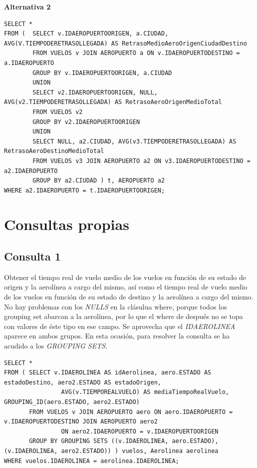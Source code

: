 \documentclass{article}
\begin{document}
\textbf{Alternativa 2}
\begin{lstlisting}
SELECT *
FROM (	SELECT v.IDAEROPUERTOORIGEN, a.CIUDAD, AVG(V.TIEMPODERETRASOLLEGADA) AS RetrasoMedioAeroOrigenCiudadDestino
		FROM VUELOS v JOIN AEROPUERTO a ON v.IDAEROPUERTODESTINO = a.IDAEROPUERTO 
		GROUP BY v.IDAEROPUERTOORIGEN, a.CIUDAD
		UNION
		SELECT v2.IDAEROPUERTOORIGEN, NULL, AVG(v2.TIEMPODERETRASOLLEGADA) AS RetrasoAeroOrigenMedioTotal
		FROM VUELOS v2 
		GROUP BY v2.IDAEROPUERTOORIGEN 
		UNION
		SELECT NULL, a2.CIUDAD, AVG(v3.TIEMPODERETRASOLLEGADA) AS RetrasoAeroDestinoMedioTotal
		FROM VUELOS v3 JOIN AEROPUERTO a2 ON v3.IDAEROPUERTODESTINO = a2.IDAEROPUERTO 
		GROUP BY a2.CIUDAD ) t, AEROPUERTO a2
WHERE a2.IDAEROPUERTO = t.IDAEROPUERTOORIGEN;
\end{lstlisting}


\newpage
\section{Consultas propias}

\subsection{Consulta 1}
Obtener el tiempo real de vuelo medio de los vuelos en función de su estado de origen y la aerolínea a cargo del mismo, así como  el tiempo real de vuelo medio de los vuelos  en función de su estado de destino y la aerolínea a cargo del mismo.\\

No hay problemas con los \textit{NULLS} en la clásulua where, porque todos los grouping set abarcan a la aerolínea, por lo que el where de después no se topa con valores de éste tipo en ese campo. Se aprovecha que el \textit{IDAEROLINEA} aparece en ambos grupos. En esta ocasión, para resolver la consulta se ha acudido a los \textit{GROUPING SETS}.

\begin{lstlisting}
SELECT *
FROM ( SELECT v.IDAEROLINEA AS idAerolinea, aero.ESTADO AS estadoDestino, aero2.ESTADO AS estadoOrigen, 
				AVG(v.TIEMPOREALVUELO) AS mediaTiempoRealVuelo, GROUPING_ID(aero.ESTADO, aero2.ESTADO) 
	   FROM VUELOS v JOIN AEROPUERTO aero ON aero.IDAEROPUERTO = v.IDAEROPUERTODESTINO JOIN AEROPUERTO aero2 
	   			ON aero2.IDAEROPUERTO = v.IDAEROPUERTOORIGEN 
	   GROUP BY GROUPING SETS ((v.IDAEROLINEA, aero.ESTADO), (v.IDAEROLINEA, aero2.ESTADO)) ) vuelos, Aerolinea aerolinea 
WHERE vuelos.IDAEROLINEA = aerolinea.IDAEROLINEA;
\end{lstlisting}
\end{document}
